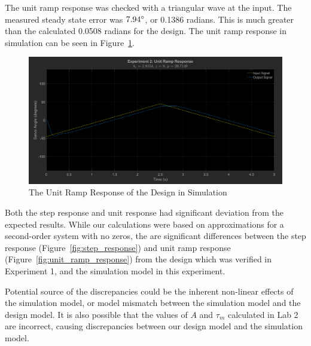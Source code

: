 \documentclass[12pt]{article}
\begin{document}
The unit ramp response was checked with a triangular wave at the input. The measured steady state error was $7.94\degree$, or 0.1386 radians. This is much greater than the calculated 0.0508 radians for the design. The unit ramp response in simulation can be seen in Figure~\ref{fig:exp2_unit_ramp}.

\begin{figure}[h!]
	\centering
	\includegraphics[width=\textwidth]{exp2_unit_ramp_response}
	\caption{\label{fig:exp2_unit_ramp}The Unit Ramp Response of the Design in Simulation}
\end{figure}

Both the step response and unit response had significant deviation from the expected results. While our calculations were based on approximations for a second-order system with no zeros, the are significant differences between the step response (Figure~\ref{fig:step_response}) and unit ramp response (Figure~\ref{fig:unit_ramp_response}) from the design which was verified in Experiment 1, and the simulation model in this experiment.

Potential source of the discrepancies could be the inherent non-linear effects of the simulation model, or model mismatch between the simulation model and the design model. It is also possible that the values of $A$ and $\tau_m$ calculated in Lab 2 are incorrect, causing discrepancies between our design model and the simulation model.
\end{document}
